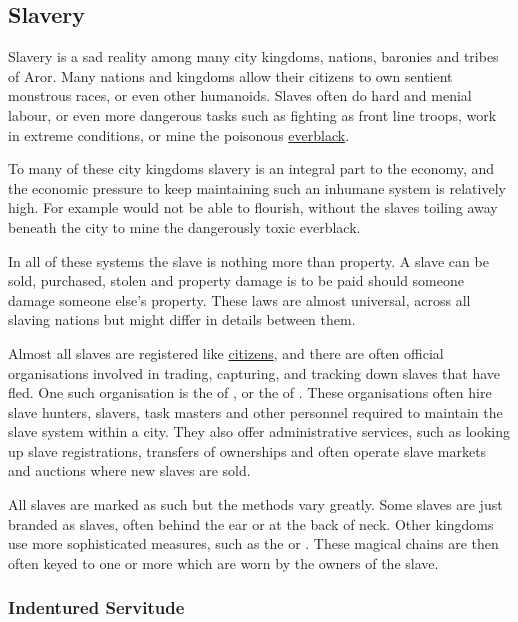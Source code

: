 \subsection{Slavery}
\label{sec:Slavery}

Slavery is a sad reality among many city kingdoms, nations, baronies and
tribes of Aror. Many nations and kingdoms allow their citizens to own
sentient monstrous races, or even other humanoids. Slaves often do
hard and menial labour, or even more dangerous tasks such as fighting
as front line troops, work in extreme conditions, or mine the poisonous
\hyperref[sec:Everblack]{everblack}.

To many of these city kingdoms slavery is an integral part to the economy,
and the economic pressure to keep maintaining such an inhumane system
is relatively high. For example  would not be able
to flourish, without the slaves toiling away beneath the city to mine
the dangerously toxic everblack.

In all of these systems the slave is nothing more than property. A slave
can be sold, purchased, stolen and property damage is to be paid should
someone damage someone else's property. These laws are almost universal,
across all slaving nations but might differ in details between them.

Almost all slaves are registered like \hyperref[sec:Citizenship]{citizens},
and there are often official organisations involved in trading, capturing,
and tracking down slaves that have fled. One such organisation is the
 of , or the
 of . These organisations
often hire slave hunters, slavers, task masters and other personnel required
to maintain the slave system within a city. They also offer administrative
services, such as looking up slave registrations, transfers of ownerships and
often operate slave markets and auctions where new slaves are sold.

All slaves are marked as such but the methods vary greatly. Some slaves
are just branded as slaves, often behind the ear or at the back of neck.
Other kingdoms use more sophisticated measures, such as the
 or . These magical
chains are then often keyed to one or more  which
are worn by the owners of the slave.

\subsubsection{Indentured Servitude}
\label{sec:Indentured Servitude}

